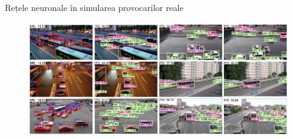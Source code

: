 \begin{frame}{Rețele neuronale în simularea provocarilor reale}   
    \begin{figure}[ht]
    \centering
    {\includegraphics[width=12cm]{images/aplicatiiNN/1rares.jpeg}}
    \end{figure}
\end{frame}